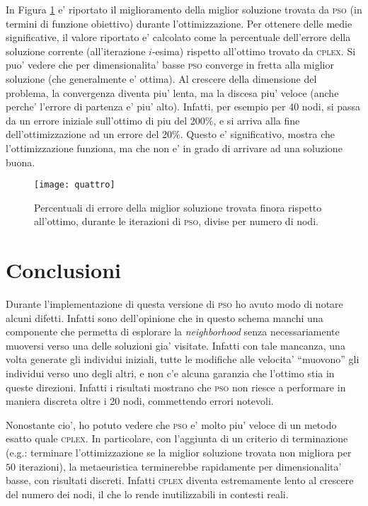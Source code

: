 \documentclass[
12pt, %
a4paper, %
oneside, %
headinclude,footinclude, %
BCOR5mm, %
]{scrartcl}
\begin{document}
In Figura \ref{fig:quattro} e' riportato il miglioramento della miglior soluzione trovata da \textsc{pso} (in termini di funzione obiettivo) durante l'ottimizzazione. Per ottenere delle medie significative, il valore riportato e' calcolato come la percentuale dell'errore della soluzione corrente (all'iterazione $i$-esima) rispetto all'ottimo trovato da \textsc{cplex}. Si puo' vedere che per dimensionalita' basse \textsc{pso} converge in fretta alla miglior soluzione (che generalmente e' ottima). Al crescere della dimensione del problema, la convergenza diventa piu' lenta, ma la discesa piu' veloce (anche perche' l'errore di partenza e' piu' alto). Infatti, per esempio per 40 nodi, si passa da un errore iniziale sull'ottimo di piu del 200\%, e si arriva alla fine dell'ottimizzazione ad un errore del 20\%. Questo e' significativo, mostra che l'ottimizzazione funziona, ma che non e' in grado di arrivare ad una soluzione buona.

\begin{figure}[H]
	\centering
	\texttt{[image: quattro]}
	\caption[]{Percentuali di errore della miglior soluzione trovata finora rispetto all'ottimo, durante le iterazioni di \textsc{pso}, divise per numero di nodi.}
	\label{fig:quattro}
\end{figure}

\section{Conclusioni}\label{sec:conclusioni}

Durante l'implementazione di questa versione di \textsc{pso} ho avuto modo di notare alcuni difetti. Infatti sono dell'opinione che in questo schema manchi una componente che permetta di esplorare la \textit{neighborhood} senza necessariamente muoversi verso una delle soluzioni gia' visitate. Infatti con tale mancanza, una volta generate gli individui iniziali, tutte le modifiche alle velocita' ``muovono'' gli individui verso uno degli altri, e non c'e alcuna garanzia che l'ottimo stia in queste direzioni. Infatti i risultati mostrano che \textsc{pso} non riesce a performare in maniera discreta oltre i 20 nodi, commettendo errori notevoli.
 
Nonostante cio', ho potuto vedere che \textsc{pso} e' molto piu' veloce di un metodo esatto quale \textsc{cplex}. In particolare, con l'aggiunta di un criterio di terminazione (e.g.: terminare l'ottimizzazione se la miglior soluzione trovata non migliora per $50$ iterazioni), la metaeuristica terminerebbe rapidamente per dimensionalita' basse, con risultati discreti. Infatti \textsc{cplex} diventa estremamente lento al crescere del numero dei nodi, il che lo rende inutilizzabili in contesti reali.

\renewcommand{\refname}{\spacedlowsmallcaps{References}} %




\end{document}
